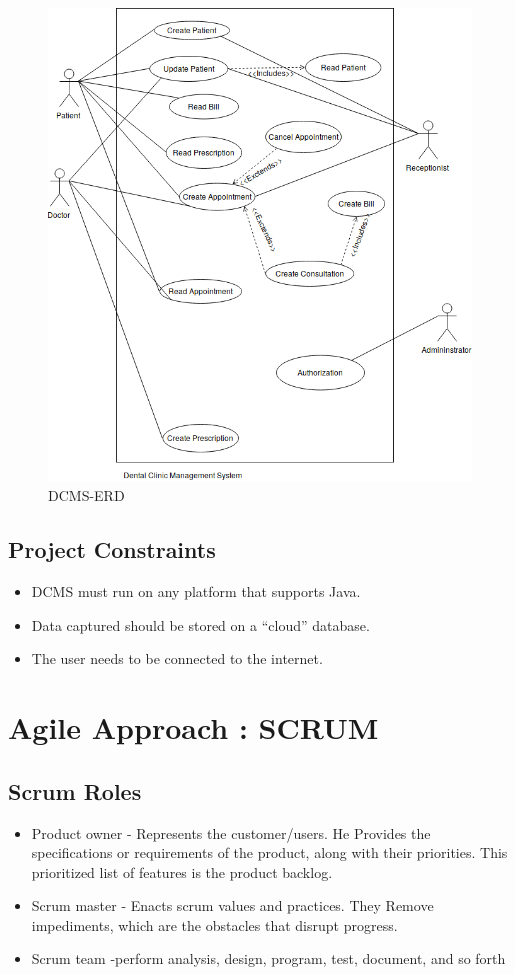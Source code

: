 \documentclass[11 pt]{article}
\begin{document}
\begin{figure}[h]
    \centering
    \includegraphics[scale = 0.5]{Use Case Diagram.png}
    \caption{DCMS-ERD}
    \label{fig:ERD}
    \end{figure}

    \subsection{Project Constraints}
    \begin{itemize}
    \item
    DCMS must run on any platform that supports Java.
    \item
    Data captured should be stored on a “cloud” database.
    \item
    The user needs to be connected to the internet.
    \end{itemize}
\section{Agile Approach : SCRUM }
\subsection{Scrum Roles}
\begin{itemize}
    \item
    Product owner - Represents the customer/users.  He Provides the specifications or requirements of the product, along with their priorities. This prioritized list of features is the product backlog.
    \item
    Scrum master - Enacts scrum values and practices. They Remove impediments, which are the obstacles that disrupt progress.
    \item
    Scrum team -perform analysis, design, program, test, document, and so forth
    \end{itemize}
\end{document}

